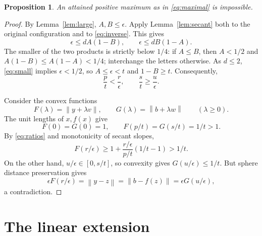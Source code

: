 \documentclass[11pt]{article}
\newtheorem{proposition}[theorem]{Proposition}
\theoremstyle{remark}
\newcommand{\norm}[1]{\left\lVert#1\right\rVert}
\begin{document}
\begin{proposition}\label{prop:no-defect}
An attained positive maximum as in \eqref{eq:maximal} is impossible.
\end{proposition}
\begin{proof}
By Lemma~\ref{lem:large}, $A,B\le\epsilon$. Apply Lemma~\ref{lem:secant} both to the original configuration and to \eqref{eq:inverse}. This gives
\begin{equation}\label{eq:small}
\epsilon\le dA(1-B),\qquad \epsilon\le dB(1-A).
\end{equation}
The smaller of the two products is strictly below $1/4$: if $A\le B$, then $A<1/2$ and $A(1-B)\le A(1-A)<1/4$; interchange the letters otherwise. As $d\le2$, \eqref{eq:small} implies $\epsilon<1/2$, so $A\le\epsilon<t$ and $1-B\ge t$. Consequently,
\begin{equation}\label{eq:ratios}
\frac p t<\frac r\epsilon,\qquad
\frac s t\ge\frac u\epsilon.
\end{equation}

Consider the convex functions
\[
F(\lambda)=\norm{y+\lambda v},\qquad
G(\lambda)=\norm{b+\lambda w}\qquad(\lambda\ge0).
\]
The unit lengths of $x,f(x)$ give
\[
F(0)=G(0)=1,\qquad F(p/t)=G(s/t)=1/t>1.
\]
By \eqref{eq:ratios} and monotonicity of secant slopes,
\[
F(r/\epsilon)\ge1+\frac{r/\epsilon}{p/t}(1/t-1)>1/t.
\]
On the other hand, $u/\epsilon\in[0,s/t]$, so convexity gives $G(u/\epsilon)\le1/t$. But sphere distance preservation gives
\[
\epsilon F(r/\epsilon)=\norm{y-z}
=\norm{b-f(z)}=\epsilon G(u/\epsilon),
\]
a contradiction.
\end{proof}

\section{The linear extension}\label{sec:extension}
\end{document}
